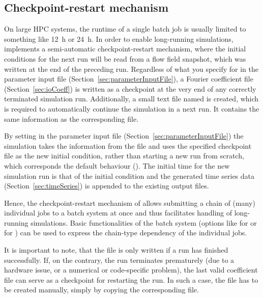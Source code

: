 \documentclass[a4paper, 11pt, DIV=11]{scrartcl}
\begin{document}
\subsection{Checkpoint-restart mechanism}
\label{sec:checkpoint}

On large HPC systems, the runtime of a single batch job is usually limited to something like
\SI{12}{\hour} or \SI{24}{\hour}. In order to enable long-running simulations, \nsc implements
a semi-automatic checkpoint-restart mechanism, where the initial conditions for the next run
will be read from a flow field snapshot, which was written at the end of the preceding run.
Regardless of what you specify for  in the parameter input file
(Section~\ref{sec:parameterInputFile}), a Fourier coefficient file (Section~\ref{sec:ioCoeff})
is written as a checkpoint at the very end of any correctly terminated simulation run.
Additionally, a small text file named  is created, which is required to
automatically continue the simulation in a next run. It contains the same information as the
corresponding  file.
\par
By setting  in the parameter input file (Section~\ref{sec:parameterInputFile})
the simulation takes the information from the  file and uses the specified
checkpoint file as the new initial condition, rather than starting a new run from scratch,
which corresponds the default behaviour (). The initial time for the new
simulation run is that of the initial condition and the generated time series data
(Section~\ref{sec:timeSeries}) is appended to the existing output files.
\par
Hence, the checkpoint-restart mechanism of \nsc allows submitting a chain of (many) individual
jobs to a batch system at once and thus facilitates handling of long-running simulations. Basic
functionalities of the batch system (\eg options like  for \sge or
 for \slurm) can be used to express the chain-type dependency of the
individual jobs.
\par
It is important to note, that the  file is only written if a run
has finished successfully. If, on the contrary, the run terminates prematurely
(\eg due to a hardware issue, or a numerical or code-specific problem), the
last valid coefficient file can serve as a checkpoint for restarting the run. In
such a case, the  file has to be created manually, simply by
copying the corresponding  file.
\par
\end{document}
